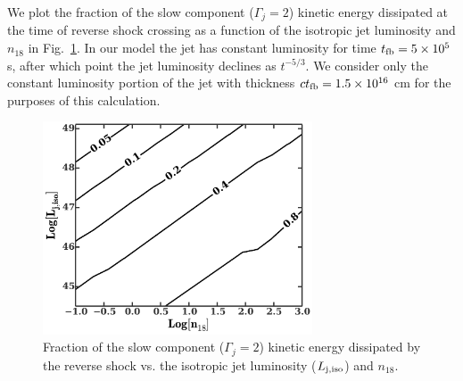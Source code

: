 \documentclass[usenatbib,fleqn]{mnras}
\begin{document}
We plot the fraction of the slow component ($\Gamma_j=2$) kinetic
energy dissipated at the time of reverse shock crossing as a function
of the isotropic jet luminosity and $n_{18}$ in
Fig.~\ref{fig:diss}. In our model the jet has constant luminosity for
time $t_{\rm fb}=5\times 10^5$ s, after which point the jet luminosity
declines as $t^{-5/3}$. We consider only the constant luminosity
portion of the jet with thickness $c t_{\rm fb}=1.5 \times 10^{16}$ cm
for the purposes of this calculation.

\begin{figure}
\includegraphics[width=8cm]{diss.pdf}
\caption{\label{fig:diss} Fraction of the slow component
  ($\Gamma_j=2$) kinetic energy dissipated by the reverse shock
  vs. the isotropic jet luminosity ($L_{\rm j,iso}$) and $n_{18}$.}
\end{figure}





\end{document}
